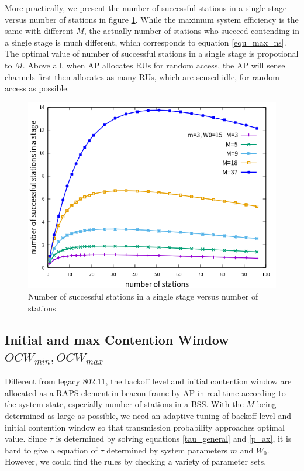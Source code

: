 More practically, we present the number of successful stations in a single stage versus number of stations in figure \ref{fig_n_M_ns}.
While the maximum system efficiency is the same with different $M$, the actually number of stations who succeed contending in a single stage is much different, which corresponds to equation \ref{equ_max_ns}. 
The optimal value of number of successful stations in a single stage is propotional to $M$. 
Above all, when AP allocates RUs for random access, the AP will sense channels first then allocates as many RUs, which are sensed idle, for random access as possible.

\begin{figure}[!ht]
\includegraphics[scale=.54]{./figure/n_M_ns_perf.png}
\caption{Number of successful stations in a single stage versus number of stations}
\label{fig_n_M_ns}
\end{figure}

\subsection{Initial and max Contention Window $OCW_{min}, OCW_{max}$}
Different from legacy 802.11, the backoff level and initial contention window are allocated as a RAPS element in beacon frame by AP in real time according to the system state, especially number of stations in a BSS.
With the $M$ being determined as large as possible, we need an adaptive tuning of backoff level and initial contention window so that transmission probability approaches optimal value.
Since $\tau$ is determined by solving equations \ref{tau_general} and \ref{p_ax}, it is hard to give a equation of $\tau$ determined by system parameters $m$ and $W_0$.
However, we could find the rules by checking a variety of parameter sets.


